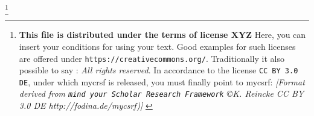 %
%
%

\footnote{\textbf{This file is distributed under the terms of license XYZ}
Here, you can insert your conditions for using your text. Good examples
for such licenses are offered under \texttt{https://creativecommons.org/}. 
Traditionally it also possible to say : \emph{All rights reserved}.
In accordance to the license \texttt{CC BY 3.0 DE}, under which mycrsf
is released, you must finally point to mycsrf:
\newline 
{ \tiny \itshape [Format derived from \texttt{mind your Scholar Research
Framework} \copyright K. Reincke CC BY 3.0 DE http://fodina.de/mycsrf)] }}

